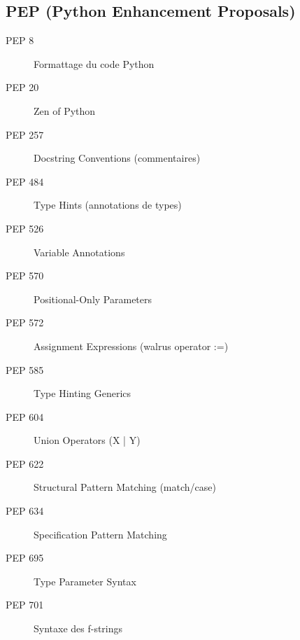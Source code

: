 \documentclass{article}
\begin{document}
\begin{multicols*}{4}
\subsection*{PEP (Python Enhancement Proposals)}
\begin{description}
    \item[PEP 8] Formattage du code Python
    \item[PEP 20] Zen of Python
    \item[PEP 257] Docstring Conventions (commentaires)
    \item[PEP 484] Type Hints (annotations de types)
    \item[PEP 526] Variable Annotations
    \item[PEP 570] Positional-Only Parameters
    \item[PEP 572] Assignment Expressions (walrus operator :=)
    \item[PEP 585] Type Hinting Generics
    \item[PEP 604] Union Operators (X | Y)
    \item[PEP 622] Structural Pattern Matching (match/case)
    \item[PEP 634] Specification Pattern Matching
    \item[PEP 695] Type Parameter Syntax
    \item[PEP 701] Syntaxe des f-strings
\end{description}

\end{multicols*}
\end{document}
